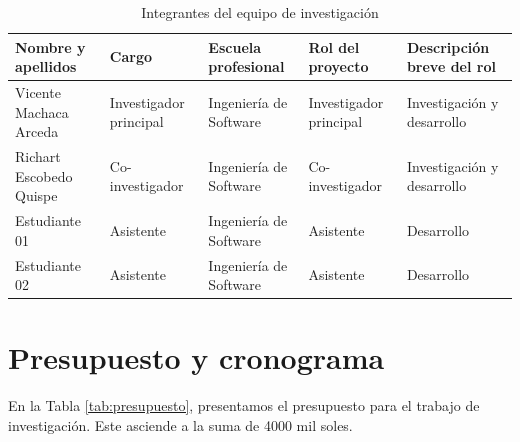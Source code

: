 \documentclass[a4paper]{article}
\begin{document}
\begin{table}[H]
\caption{Integrantes del equipo de investigación}
\label{tab:integrantes}
\setlength{\tabcolsep}{0.5em} %
{\renewcommand{\arraystretch}{1.2}%
\begin{tabular}{|p{3cm}p{2.2cm}p{2.3cm}p{2.5cm}p{3.3cm}|} \hline
\textbf{Nombre y apellidos} & \textbf{Cargo}         & \textbf{Escuela profesional} & \textbf{Rol del proyecto} & \textbf{Descripción breve del rol} \\ \hline
Vicente Machaca Arceda      & Investigador principal & Ingeniería de Software       & Investigador principal    & Investigación y desarrollo         \\
Richart Escobedo Quispe     & Co-investigador        & Ingeniería de Software       & Co-investigador           & Investigación y desarrollo         \\
Estudiante 01               & Asistente              & Ingeniería de Software       & Asistente                 & Desarrollo                         \\
Estudiante 02               & Asistente              & Ingeniería de Software       & Asistente                 & Desarrollo          \\ \hline              
\end{tabular}
}
\end{table}


\section{Presupuesto y cronograma}

En la Tabla \ref{tab:presupuesto}, presentamos el presupuesto para el trabajo de investigación. Este asciende a la suma de 4000 mil soles.
\end{document}

